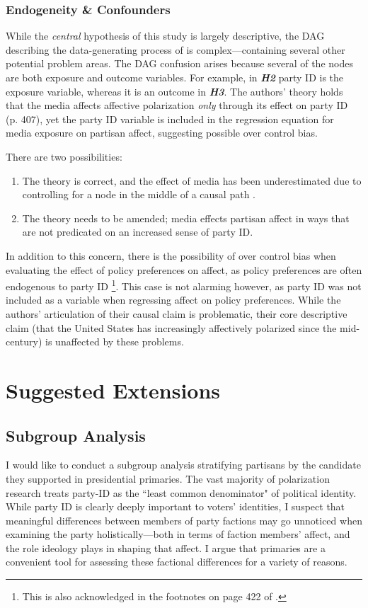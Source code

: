\documentclass[12pt]{article}
\begin{document}
\subsubsection{Endogeneity \& Confounders}


While the \textit{central} hypothesis of this study is largely descriptive, the DAG describing the data-generating process of \citeauthor{iyengar2012affect} is complex---containing several other potential problem areas. The DAG confusion arises because several of the nodes are both exposure and outcome variables. For example, in \textbf{\textit{H2}} party ID is the exposure variable, whereas it is an outcome in \textbf{\textit{H3}}. The authors' theory holds that the media affects affective polarization \textit{only} through its effect on party ID (p. 407), yet the party ID variable is included in the regression equation for media exposure on partisan affect, suggesting possible over control bias.

There are two possibilities:
\begin{enumerate}
\item The theory is correct, and the effect of media has been underestimated due to controlling for a node  in the middle of a causal path \citep{elwert2014endogenous}.
\item The theory needs to be amended; media effects partisan affect in ways that are not predicated on an increased sense of party ID.
\end{enumerate}
In addition to this concern, there is the possibility of over control bias when evaluating the effect of policy preferences on affect, as policy preferences are often endogenous to party ID \citep{druckman2013elite}\footnote{This is also acknowledged in the footnotes on page 422 of \citeauthor{iyengar2012affect}.}. This case is not alarming however, as party ID was not included as a variable when regressing affect on policy preferences. While the authors' articulation of their causal claim is problematic, their core descriptive claim (that the United States has increasingly affectively polarized since the mid- century) is unaffected by these problems.

\section{Suggested Extensions}
\subsection{Subgroup Analysis}
I would like to conduct a subgroup analysis stratifying partisans by the candidate they supported in presidential primaries. The vast majority of polarization research treats party-ID as the ``least common denominator" of political identity. While party ID is clearly deeply important to voters' identities, I suspect that meaningful differences between members of party factions may go unnoticed when examining the party holistically---both in terms of faction members' affect, and the role ideology plays in shaping that affect. I argue that primaries are a convenient tool for assessing these factional differences for a variety of reasons.
\end{document}
